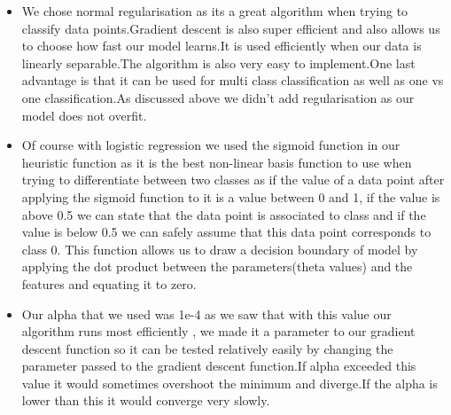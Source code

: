 \documentclass{article}
\begin{document}
\begin{itemize}
    \item We chose normal regularisation as its a great algorithm when trying to classify data points.Gradient descent is also super efficient and also allows us to choose how fast our model learns.It is used efficiently when our data is linearly separable.The algorithm is also very easy to implement.One last advantage is that it can be used for multi class classification as well as one vs one classification.As discussed above we didn't add regularisation as our model does not overfit.
    \item Of course with logistic regression we used the sigmoid function in our heuristic function as it is the best non-linear basis function to use when trying to differentiate between two classes as if the value of a data point after applying the sigmoid function to it is a value between 0 and 1, if the value is above 0.5 we can state that the data point is associated to class and if the value is below 0.5 we can safely assume that this data point corresponds to class 0. This function allows us to draw a decision boundary of model by applying the dot product between the parameters(theta values) and the features and equating it to zero.
    \item Our alpha that we used was 1e-4 as we saw that with this value our algorithm runs most efficiently , we made it a parameter to our gradient descent function so it can be tested relatively easily by changing the parameter passed to the gradient descent function.If alpha exceeded this value it would sometimes overshoot the minimum and diverge.If the alpha is lower than this it would converge very slowly.
\end{itemize}
\end{document}
